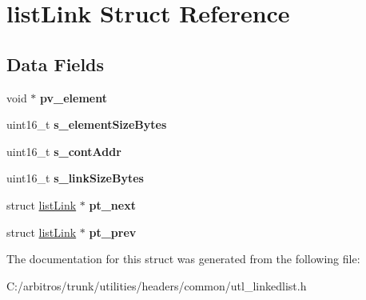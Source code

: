 \hypertarget{structlist_link}{\section{list\-Link Struct Reference}
\label{structlist_link}
}
\subsection*{Data Fields}
\begin{DoxyCompactItemize}
\item 
\hypertarget{structlist_link_ab34ba6b213f1b6be9b8fbb9ed5ea50de}{void $\ast$ {\bfseries pv\-\_\-element}}\label{structlist_link_ab34ba6b213f1b6be9b8fbb9ed5ea50de}

\item 
\hypertarget{structlist_link_aad2e96fd3a0b75e3a7d314eabb08bc2b}{uint16\-\_\-t {\bfseries s\-\_\-element\-Size\-Bytes}}\label{structlist_link_aad2e96fd3a0b75e3a7d314eabb08bc2b}

\item 
\hypertarget{structlist_link_ab6a669366106c0a82a7ff6b2aed5c915}{uint16\-\_\-t {\bfseries s\-\_\-cont\-Addr}}\label{structlist_link_ab6a669366106c0a82a7ff6b2aed5c915}

\item 
\hypertarget{structlist_link_a6904a7252c37d795af502f166930283a}{uint16\-\_\-t {\bfseries s\-\_\-link\-Size\-Bytes}}\label{structlist_link_a6904a7252c37d795af502f166930283a}

\item 
\hypertarget{structlist_link_a27153ba7aa91e597195e2459a18d9bbb}{struct \hyperlink{structlist_link}{list\-Link} $\ast$ {\bfseries pt\-\_\-next}}\label{structlist_link_a27153ba7aa91e597195e2459a18d9bbb}

\item 
\hypertarget{structlist_link_acbd20e20dbad288dc19aa04f85501688}{struct \hyperlink{structlist_link}{list\-Link} $\ast$ {\bfseries pt\-\_\-prev}}\label{structlist_link_acbd20e20dbad288dc19aa04f85501688}

\end{DoxyCompactItemize}


The documentation for this struct was generated from the following file\-:\begin{DoxyCompactItemize}
\item 
C\-:/arbitros/trunk/utilities/headers/common/utl\-\_\-linkedlist.\-h\end{DoxyCompactItemize}
